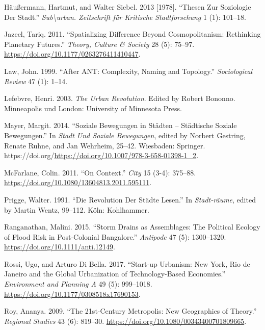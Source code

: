 \documentclass[
]{article}
\newlength{\cslhangindent}
\newlength{\cslentryspacingunit} %
\newenvironment{CSLReferences}[2] %
 {%
  \setlength{\parindent}{0pt}
  \ifodd #1
  \let\oldpar\par
  \def\par{\hangindent=\cslhangindent\oldpar}
  \fi
  \setlength{\parskip}{#2\cslentryspacingunit}
 }%
 {}
\begin{document}
\begin{CSLReferences}{1}{0}
\leavevmode{}%
Häußermann, Hartmut, and Walter Siebel. 2013 {[}1978{]}. {``Thesen Zur Soziologie Der Stadt.''} \emph{Sub\textbackslash urban. Zeitschrift f{ü}r Kritische Stadtforschung} 1 (1): 101--18.

\leavevmode{}%
Jazeel, Tariq. 2011. {``Spatializing Difference Beyond Cosmopolitanism: Rethinking Planetary Futures.''} \emph{Theory, Culture {\&} Society} 28 (5): 75--97. \url{https://doi.org/10.1177/0263276411410447}.

\leavevmode{}%
Law, John. 1999. {``After ANT: Complexity, Naming and Topology.''} \emph{Sociological Review} 47 (1): 1--14.

\leavevmode{}%
Lefebvre, Henri. 2003. \emph{The Urban Revolution}. Edited by Robert Bononno. Minneapolis und London: University of Minnesota Press.

\leavevmode{}%
Mayer, Margit. 2014. {``Soziale Bewegungen in St{ä}dten -- St{ä}dtische Soziale Bewegungen.''} In \emph{Stadt Und Soziale Bewegungen}, edited by Norbert Gestring, Renate Ruhne, and Jan Wehrheim, 25--42. Wiesbaden: Springer. https://doi.org/\url{https://doi.org/10.1007/978-3-658-01398-1_2}.

\leavevmode{}%
McFarlane, Colin. 2011. {``On Context.''} \emph{City} 15 (3-4): 375--88. \url{https://doi.org/10.1080/13604813.2011.595111}.

\leavevmode{}%
Prigge, Walter. 1991. {``Die {Revolution} Der {St{ä}dte} Lesen.''} In \emph{Stadt-r{ä}ume}, edited by Martin Wentz, 99--112. K{ö}ln: Kohlhammer.

\leavevmode{}%
Ranganathan, Malini. 2015. {``Storm Drains as Assemblages: The Political Ecology of Flood Risk in Post-Colonial Bangalore.''} \emph{Antipode} 47 (5): 1300--1320. \url{https://doi.org/10.1111/anti.12149}.

\leavevmode{}%
Rossi, Ugo, and Arturo Di Bella. 2017. {``Start-up Urbanism: New York, Rio de Janeiro and the Global Urbanization of Technology-Based Economies.''} \emph{Environment and Planning A} 49 (5): 999--1018. \url{https://doi.org/10.1177/0308518x17690153}.

\leavevmode{}%
Roy, Ananya. 2009. {``The 21st-Century Metropolis: New Geographies of Theory.''} \emph{Regional Studies} 43 (6): 819--30. \url{https://doi.org/10.1080/00343400701809665}.


\end{CSLReferences}
\end{document}
